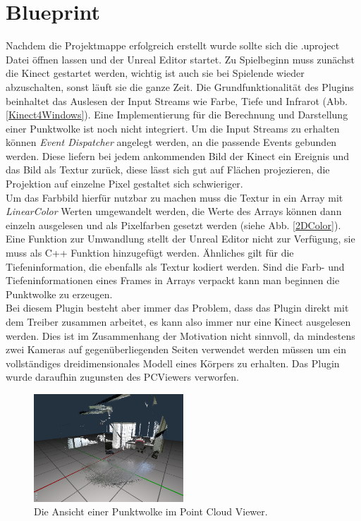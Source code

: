 \documentclass[a4paper]{IEEEtran}
\begin{document}
\section{Blueprint}
	Nachdem die Projektmappe erfolgreich erstellt wurde sollte sich die .uproject Datei öffnen lassen und der Unreal Editor startet.
	Zu Spielbeginn muss zunächst die Kinect gestartet werden, wichtig ist auch sie bei Spielende wieder abzuschalten, sonst läuft sie die ganze Zeit. 
	Die Grundfunktionalität des Plugins beinhaltet das Auslesen der Input Streams wie Farbe, Tiefe und Infrarot (Abb. \ref{Kinect4Windows}).
	Eine Implementierung für die Berechnung und Darstellung einer Punktwolke ist noch nicht integriert.
	Um die Input Streams zu erhalten können {\textit{Event Dispatcher}} angelegt werden, an die passende Events gebunden werden. 
	Diese liefern bei jedem ankommenden Bild der Kinect ein Ereignis und das Bild als Textur zurück, diese lässt sich gut auf Flächen projezieren, die Projektion auf einzelne Pixel gestaltet sich schwieriger. \\
	Um das Farbbild hierfür nutzbar zu machen muss die Textur in ein Array mit {\textit{LinearColor}} Werten umgewandelt werden, die Werte des Arrays können dann einzeln ausgelesen und als Pixelfarben gesetzt werden (siehe Abb. \ref{2DColor}). 
	Eine Funktion zur Umwandlung stellt der Unreal Editor nicht zur Verfügung, sie muss als C++ Funktion hinzugefügt werden. 
	Ähnliches gilt für die Tiefeninformation, die ebenfalls als Textur kodiert werden. 
	Sind die Farb- und Tiefeninformationen eines Frames in Arrays verpackt kann man beginnen die Punktwolke zu erzeugen.\\
	Bei diesem Plugin besteht aber immer das Problem, dass das Plugin direkt mit dem Treiber zusammen arbeitet, es kann also immer nur eine Kinect ausgelesen werden. 
	Dies ist im Zusammenhang der Motivation nicht sinnvoll, da mindestens zwei Kameras auf gegenüberliegenden Seiten verwendet werden müssen um ein vollständiges dreidimensionales Modell eines Körpers zu erhalten.
	Das Plugin wurde daraufhin zugunsten des PCViewers verworfen.\\

	\begin{figure}[!h]
    	\centering
		\includegraphics[width=0.5\textwidth]{img/CloudPCViewer}
	    \caption{Die Ansicht einer Punktwolke im Point Cloud Viewer.}
    	\label{CloudPCViewer}
	\end{figure}
	
\end{document}
